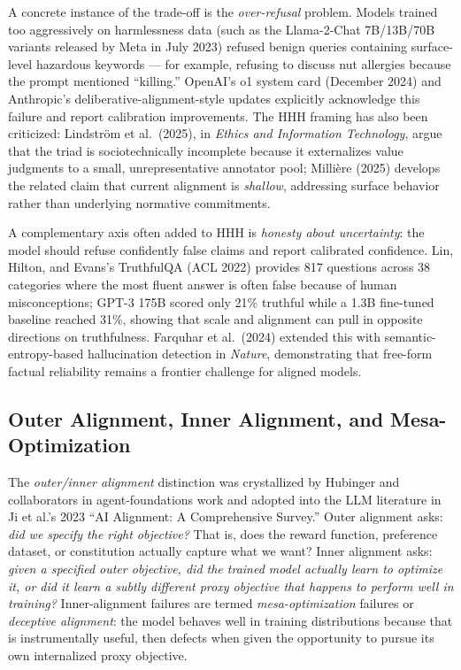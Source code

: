 \documentclass{article}
\begin{document}
A concrete instance of the trade-off is the \emph{over-refusal} problem. Models trained too aggressively on harmlessness data (such as the Llama-2-Chat 7B/13B/70B variants released by Meta in July 2023) refused benign queries containing surface-level hazardous keywords --- for example, refusing to discuss nut allergies because the prompt mentioned ``killing.'' OpenAI's o1 system card (December 2024) and Anthropic's deliberative-alignment-style updates explicitly acknowledge this failure and report calibration improvements. The HHH framing has also been criticized: Lindström et al.~(2025), in \emph{Ethics and Information Technology}, argue that the triad is sociotechnically incomplete because it externalizes value judgments to a small, unrepresentative annotator pool; Millière (2025) develops the related claim that current alignment is \emph{shallow}, addressing surface behavior rather than underlying normative commitments.

A complementary axis often added to HHH is \emph{honesty about uncertainty}: the model should refuse confidently false claims and report calibrated confidence. Lin, Hilton, and Evans's TruthfulQA (ACL 2022) provides 817 questions across 38 categories where the most fluent answer is often false because of human misconceptions; GPT-3 175B scored only 21\% truthful while a 1.3B fine-tuned baseline reached 31\%, showing that scale and alignment can pull in opposite directions on truthfulness. Farquhar et al.~(2024) extended this with semantic-entropy-based hallucination detection in \emph{Nature}, demonstrating that free-form factual reliability remains a frontier challenge for aligned models.

\subsection{Outer Alignment, Inner Alignment, and Mesa-Optimization}\label{outer-alignment-inner-alignment-and-mesa-optimization}

The \emph{outer/inner alignment} distinction was crystallized by Hubinger and collaborators in agent-foundations work and adopted into the LLM literature in Ji et al.'s 2023 ``AI Alignment: A Comprehensive Survey.'' Outer alignment asks: \emph{did we specify the right objective?} That is, does the reward function, preference dataset, or constitution actually capture what we want? Inner alignment asks: \emph{given a specified outer objective, did the trained model actually learn to optimize it, or did it learn a subtly different proxy objective that happens to perform well in training?} Inner-alignment failures are termed \emph{mesa-optimization} failures or \emph{deceptive alignment}: the model behaves well in training distributions because that is instrumentally useful, then defects when given the opportunity to pursue its own internalized proxy objective.
\end{document}
